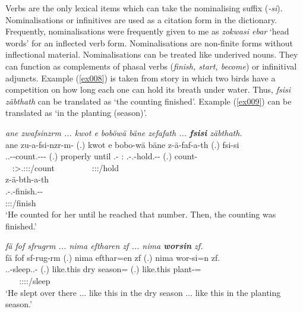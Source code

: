 Verbs are the only lexical items which can take the nominalising suffix (\emph{-si}). Nominalisations or infinitives are used as a citation form in the dictionary. Frequently, nominalisations were frequently given to me as \emph{zokwasi ebar} `head words' for an inflected verb form. Nominalisations are non-finite forms without inflectional material. Nominalisations can be treated like underived nouns. They can function as complements of phasal verbs (\textit{finish, start, become}) or infinitival adjuncts. Example (\ref{ex008}) is taken from story in which two birds have a competition on how long each one can hold its breath under water. Thus, \emph{fsisi zäbthath} can be translated as `the counting finished'. Example (\ref{ex009}) can be translated as `in the planting (season)'.

\begin{exe}
	\ex \textit{ane zwafsinzrm ... kwot e boböwä bäne zefafath ... \textbf{fsisi} \linebreak zäbthath.}\\
	\glll ane zu-a-fsi-nzr-m-\Zero{} (.) kwot e bobo-wä bäne z-ä-faf-a-th (.) fsi-si\\
	\Dem{} \Tsg.\F.\Betatwo-\Vc-count.\Ext-\Ndu-\Dur-\Stsg{} (.) properly until \Med{}.\All{}-\Emph{} \Dem{}:\Med{} \M.\Gam-\Vc.\Ndu-hold.\Rs-\Pst-\Stnsg{} (.) count-\Nmlz{}\\
	~ {\Stsg:\Sbj>\Tsg.\F:\Io:\Pst:\Dur/count} ~ ~ ~ ~ ~ {\Stpl:\Sbj:\Pst:\Pfv/hold} ~ ~\\
	\sn
	\glll z-ä-bth-a-th\\
	\M.\Gam-\Vc.\Ndu-finish.\Rs-\Pst-\Stnsg{}\\
	\footnotesize{\Stpl:\Sbj:\Pst:\Pfv/finish}\\
	\trans `He counted for her until he reached that number. Then, the counting was finished.' 
	\label{ex008}
\end{exe}
\begin{exe}
	\ex \textit{fä fof sfrugrm ... nima eftharen zf ... nima \textbf{worsin} zf.}\\
	\glll fä fof sf-rug-rm (.) nima efthar=en zf (.) nima wor-si=n zf.\\
	\Dist{} \Emph{} \Tsg.\M.\Betatwo-sleep.\Ext.\Ndu-\Dur{} (.) {like.this} {dry season=\Loc} \Imm{} (.) {like.this} plant-\Nmlz=\Loc{} \Imm\\
	~ ~ {\Tsg:\M:\Sbj:\Pst:\Dur/sleep} {} {} ~ ~ ~ ~ ~ ~\\
	\trans `He slept over there ... like this in the dry season ... like this in the planting season.' 
	\label{ex009}
\end{exe}

